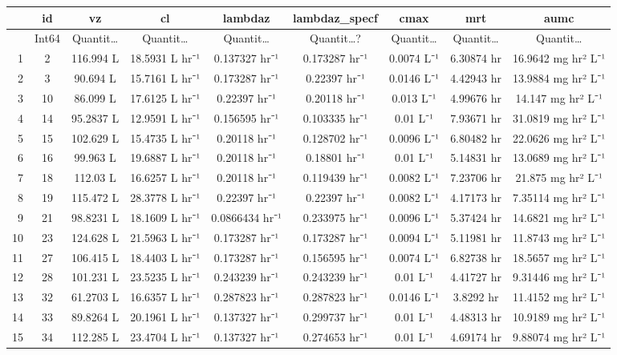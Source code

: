 \documentclass[12pt,a4paper]{article}
\begin{document}
\begin{tabular}{r|cccccccc}
	& id & vz & cl & lambdaz & lambdaz\_specf & cmax & mrt & aumc\\
	\hline
	& Int64 & Quantit… & Quantit… & Quantit… & Quantit…? & Quantit… & Quantit… & Quantit…\\
	\hline
	1 & 2 & 116.994 L & 18.5931 L hr⁻¹ & 0.137327 hr⁻¹ & 0.173287 hr⁻¹ & 0.0074 L⁻¹ & 6.30874 hr & 16.9642 mg hr² L⁻¹ \\
	2 & 3 & 90.694 L & 15.7161 L hr⁻¹ & 0.173287 hr⁻¹ & 0.22397 hr⁻¹ & 0.0146 L⁻¹ & 4.42943 hr & 13.9884 mg hr² L⁻¹ \\
	3 & 10 & 86.099 L & 17.6125 L hr⁻¹ & 0.22397 hr⁻¹ & 0.20118 hr⁻¹ & 0.013 L⁻¹ & 4.99676 hr & 14.147 mg hr² L⁻¹ \\
	4 & 14 & 95.2837 L & 12.9591 L hr⁻¹ & 0.156595 hr⁻¹ & 0.103335 hr⁻¹ & 0.01 L⁻¹ & 7.93671 hr & 31.0819 mg hr² L⁻¹ \\
	5 & 15 & 102.629 L & 15.4735 L hr⁻¹ & 0.20118 hr⁻¹ & 0.128702 hr⁻¹ & 0.0096 L⁻¹ & 6.80482 hr & 22.0626 mg hr² L⁻¹ \\
	6 & 16 & 99.963 L & 19.6887 L hr⁻¹ & 0.20118 hr⁻¹ & 0.18801 hr⁻¹ & 0.01 L⁻¹ & 5.14831 hr & 13.0689 mg hr² L⁻¹ \\
	7 & 18 & 112.03 L & 16.6257 L hr⁻¹ & 0.20118 hr⁻¹ & 0.119439 hr⁻¹ & 0.0082 L⁻¹ & 7.23706 hr & 21.875 mg hr² L⁻¹ \\
	8 & 19 & 115.472 L & 28.3778 L hr⁻¹ & 0.22397 hr⁻¹ & 0.22397 hr⁻¹ & 0.0082 L⁻¹ & 4.17173 hr & 7.35114 mg hr² L⁻¹ \\
	9 & 21 & 98.8231 L & 18.1609 L hr⁻¹ & 0.0866434 hr⁻¹ & 0.233975 hr⁻¹ & 0.0096 L⁻¹ & 5.37424 hr & 14.6821 mg hr² L⁻¹ \\
	10 & 23 & 124.628 L & 21.5963 L hr⁻¹ & 0.173287 hr⁻¹ & 0.173287 hr⁻¹ & 0.0094 L⁻¹ & 5.11981 hr & 11.8743 mg hr² L⁻¹ \\
	11 & 27 & 106.415 L & 18.4403 L hr⁻¹ & 0.173287 hr⁻¹ & 0.156595 hr⁻¹ & 0.0074 L⁻¹ & 6.82738 hr & 18.5657 mg hr² L⁻¹ \\
	12 & 28 & 101.231 L & 23.5235 L hr⁻¹ & 0.243239 hr⁻¹ & 0.243239 hr⁻¹ & 0.01 L⁻¹ & 4.41727 hr & 9.31446 mg hr² L⁻¹ \\
	13 & 32 & 61.2703 L & 16.6357 L hr⁻¹ & 0.287823 hr⁻¹ & 0.287823 hr⁻¹ & 0.0146 L⁻¹ & 3.8292 hr & 11.4152 mg hr² L⁻¹ \\
	14 & 33 & 89.8264 L & 20.1961 L hr⁻¹ & 0.137327 hr⁻¹ & 0.299737 hr⁻¹ & 0.01 L⁻¹ & 4.48313 hr & 10.9189 mg hr² L⁻¹ \\
	15 & 34 & 112.285 L & 23.4704 L hr⁻¹ & 0.137327 hr⁻¹ & 0.274653 hr⁻¹ & 0.01 L⁻¹ & 4.69174 hr & 9.88074 mg hr² L⁻¹ \\

\end{tabular}
\end{document}
